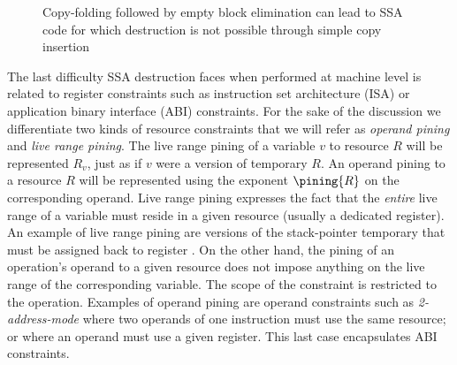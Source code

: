 \begin{figure}[h]
\hfill
{}\hfill
{}\caption{\label{fig:alternative_ssa_destruction:doublepreds} Copy-folding followed by empty block elimination can lead to SSA code for which destruction is not possible through simple copy insertion}
\end{figure}


The last difficulty SSA destruction faces when performed at machine level is related to register constraints such as instruction set architecture (ISA) or application binary interface (ABI) constraints. 
For the sake of the discussion we differentiate two kinds of resource constraints that we will refer as \emph{operand pining} and \emph{live range pining}. 
The live range pining of a variable $v$ to resource $R$ will be represented $R_v$, just as if $v$ were a version of temporary $R$. 
An operand pining to a resource $R$ will be represented using the exponent $\pining{R}$ on the corresponding operand. 
Live range pining expresses the fact that the \emph{entire} live range of a variable must reside in a given resource (usually a dedicated register). 
An example of live range pining are versions of the stack-pointer temporary that must be assigned back to register \SP. 
On the other hand, the pining of an operation's operand to a given resource does not impose anything on the live range of the corresponding variable. 
The scope of the constraint is restricted to the operation. 
Examples of operand pining are operand constraints such as \emph{2-address-mode} where two operands of one instruction must use the same resource; 
or where an operand must use a given register. 
This last case encapsulates ABI constraints.
